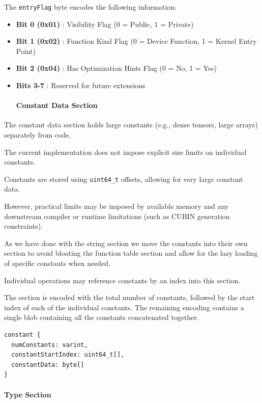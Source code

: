 \documentclass{article}
\begin{document}
The \texttt{entryFlag} byte encodes the following information:


\begin{itemize}
\item \textbf{Bit 0 (0x01)} : Visibility Flag (0 = Public, 1 = Private)
\item \textbf{Bit 1 (0x02)} : Function Kind Flag (0 = Device Function, 1 = Kernel Entry Point)
\item \textbf{Bit 2 (0x04)} : Has Optimization Hints Flag (0 = No, 1 = Yes)
\item \textbf{Bits 3-7} : Reserved for future extensions


\paragraph{Constant Data Section}

\end{itemize}
The constant data section holds large constants (e.g., dense tensors, large arrays) separately from code.


The current implementation does not impose explicit size limits on individual constants.

Constants are stored using \texttt{uint64\_t} offsets, allowing for very large constant data.

However, practical limits may be imposed by available memory and any downstream compiler or runtime limitations (such as CUBIN generation constraints).


As we have done with the string section we move the constants into their own section to avoid bloating the function table section and allow for the lazy loading of specific constants when needed.

Individual operations may reference constants by an index into this section.

The section is encoded with the total number of constants, followed by the start index of each of the individual constants. The remaining encoding contains a single blob containing all the constants concatenated together.


\begin{lstlisting}
constant {
  numConstants: varint,
  constantStartIndex: uint64_t[],
  constantData: byte[]
}
\end{lstlisting}


\paragraph{Type Section}
\end{document}
